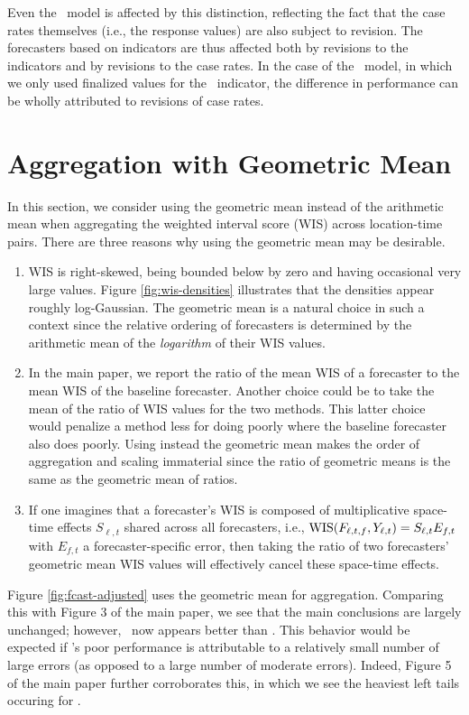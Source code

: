 Even the \ar~model is affected by this distinction, reflecting the fact that the
case rates themselves (i.e., the response values) are also subject to revision.
The forecasters based on indicators are thus affected both by revisions to the
indicators and by revisions to the case rates.  In the case of the \gs~model, in
which we only used finalized values for the \gs~indicator, the difference in
performance can be wholly attributed to revisions of case rates.

\section{Aggregation with Geometric Mean}

In this section, we consider using the geometric mean instead of the arithmetic
mean when aggregating the weighted interval score (WIS) across location-time
pairs.  There are three reasons why using the geometric mean may be desirable.
\begin{enumerate}
\item WIS is right-skewed, being bounded below by zero and having occasional 
  very large values.  Figure \ref{fig:wis-densities} illustrates that the
  densities appear roughly log-Gaussian.  The geometric mean is a natural choice  
  in such a context since the relative ordering of forecasters is determined by
  the arithmetic mean of the {\em logarithm} of their WIS values.
\item In the main paper, we report the ratio of the mean WIS of a forecaster to
  the mean WIS of the baseline forecaster. Another choice could be to take the
  mean of the ratio of WIS values for the two methods. This latter choice would
  penalize a method less for doing poorly where the baseline forecaster also
  does poorly.  Using instead the geometric mean makes the order of aggregation
  and scaling immaterial since the ratio of geometric means is the same as the 
  geometric mean of ratios.
\item If one imagines that a forecaster's WIS is composed of multiplicative
  space-time effects $S_{\ell,t}$ shared across all forecasters,
  i.e., $\mathrm{WIS}(F_{\ell,t,f},Y_{\ell,t})=S_{\ell,t}E_{f,t}$ with $E_{f,t}$ a
  forecaster-specific error, then taking the ratio of two forecasters' geometric
  mean WIS values will effectively cancel these space-time effects. 
\end{enumerate}

Figure \ref{fig:fcast-adjusted} uses the geometric mean for aggregation.
Comparing this with Figure 3 of the main paper, we see that the main conclusions
are largely unchanged; however, \chngcli~now appears better than \ar.  This
behavior would be expected if \chngcli's poor performance is attributable to a
relatively small number of large errors (as opposed to a large number of
moderate errors).  Indeed, Figure 5 of the main paper further corroborates this,
in which we see the heaviest left tails occuring for \chngcli.

